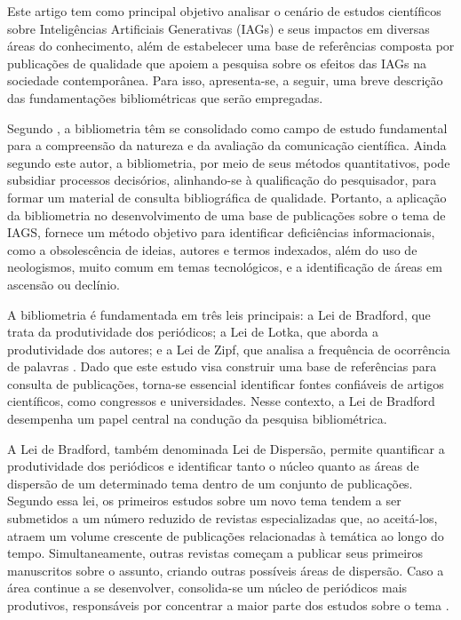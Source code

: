 \documentclass[openany,oneside,a4paper,9pt]{extarticle}
\begin{document}
Este artigo tem como principal objetivo analisar o cenário de estudos científicos sobre Inteligências Artificiais Generativas (IAGs) e seus impactos em diversas áreas do conhecimento, além de estabelecer uma base de referências composta por publicações de qualidade que apoiem a pesquisa sobre os efeitos das IAGs na sociedade contemporânea. Para isso, apresenta-se, a seguir, uma breve descrição das fundamentações bibliométricas que serão empregadas.

Segundo \textcite{gracio2020topicos}, a bibliometria têm se consolidado como campo de estudo fundamental para a compreensão da natureza e da avaliação da comunicação científica. Ainda segundo este autor, a bibliometria, por meio de seus métodos quantitativos, pode subsidiar processos decisórios, alinhando-se à qualificação do pesquisador, para formar um material de consulta bibliográfica de qualidade. Portanto, a aplicação da bibliometria no desenvolvimento de uma base de publicações sobre o tema de IAGS, fornece um método objetivo para identificar deficiências informacionais, como a obsolescência de ideias, autores e termos indexados, além do uso de neologismos, muito comum em temas tecnológicos, e a identificação de áreas em ascensão ou declínio.



A bibliometria é fundamentada em três leis principais: a Lei de Bradford, que trata da produtividade dos periódicos; a Lei de Lotka, que aborda a produtividade dos autores; e a Lei de Zipf, que analisa a frequência de ocorrência de palavras \cite{ferreira2010bibliometria}. Dado que este estudo visa construir uma base de referências para consulta de publicações, torna-se essencial identificar fontes confiáveis de artigos científicos, como congressos e universidades. Nesse contexto, a Lei de Bradford desempenha um papel central na condução da pesquisa bibliométrica.

A Lei de Bradford, também denominada Lei de Dispersão, permite quantificar a produtividade dos periódicos e identificar tanto o núcleo quanto as áreas de dispersão de um determinado tema dentro de um conjunto de publicações. Segundo essa lei, os primeiros estudos sobre um novo tema tendem a ser submetidos a um número reduzido de revistas especializadas que, ao aceitá-los, atraem um volume crescente de publicações relacionadas à temática ao longo do tempo. Simultaneamente, outras revistas começam a publicar seus primeiros manuscritos sobre o assunto, criando outras possíveis áreas de dispersão. Caso a área continue a se desenvolver, consolida-se um núcleo de periódicos mais produtivos, responsáveis por concentrar a maior parte dos estudos sobre o tema \cite{lousada2012produccao}.
\end{document}

